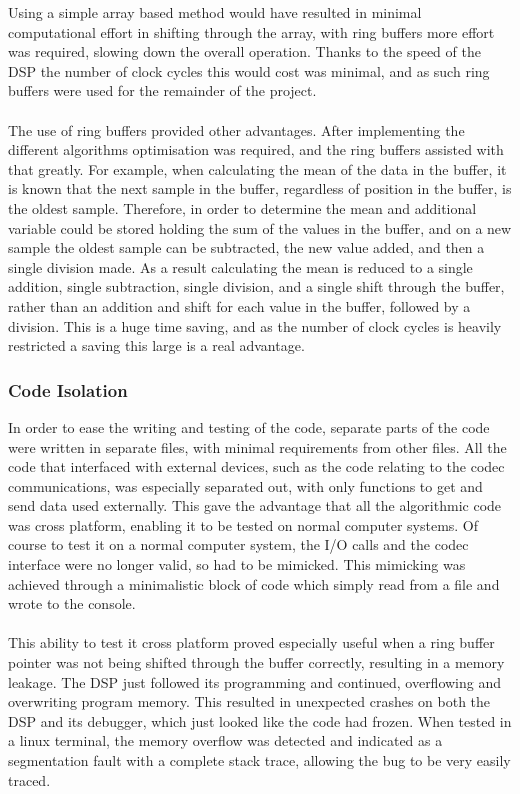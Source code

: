 Using a simple array based method would have resulted in minimal computational effort in shifting through the array, with ring buffers more effort was required, slowing down the overall operation.
Thanks to the speed of the DSP the number of clock cycles this would cost was minimal, and as such ring buffers were used for the remainder of the project.
\\
\\
The use of ring buffers provided other advantages.
After implementing the different algorithms optimisation was required, and the ring buffers assisted with that greatly.
For example, when calculating the mean of the data in the buffer, it is known that the next sample in the buffer, regardless of position in the buffer, is the oldest sample.
Therefore, in order to determine the mean and additional variable could be stored holding the sum of the values in the buffer, and on a new sample the oldest sample can be subtracted, the new value added, and then a single division made.
As a result calculating the mean is reduced to a single addition, single subtraction, single division, and a single shift through the buffer, rather than an addition and shift for each value in the buffer, followed by a division.
This is a huge time saving, and as the number of clock cycles is heavily restricted a saving this large is a real advantage.

\subsubsection{Code Isolation}
In order to ease the writing and testing of the code, separate parts of the code were written in separate files, with minimal requirements from other files.
All the code that interfaced with external devices, such as the code relating to the codec communications, was especially separated out, with only functions
to get and send data used externally.
This gave the advantage that all the algorithmic code was cross platform, enabling it to be tested on normal computer systems.
Of course to test it on a normal computer system, the I/O calls and the codec interface were no longer valid, so had to be mimicked.
This mimicking was achieved through a minimalistic block of code which simply read from a file and wrote to the console.
\\
\\
This ability to test it cross platform proved especially useful when a ring buffer pointer was not being shifted through the buffer correctly, resulting in a memory leakage.
The DSP just followed its programming and continued, overflowing and overwriting program memory.
This resulted in unexpected crashes on both the DSP and its debugger, which just looked like the code had frozen.
When tested in a linux terminal, the memory overflow was detected and indicated as a segmentation fault with a complete stack trace, allowing the bug to be very easily traced.

